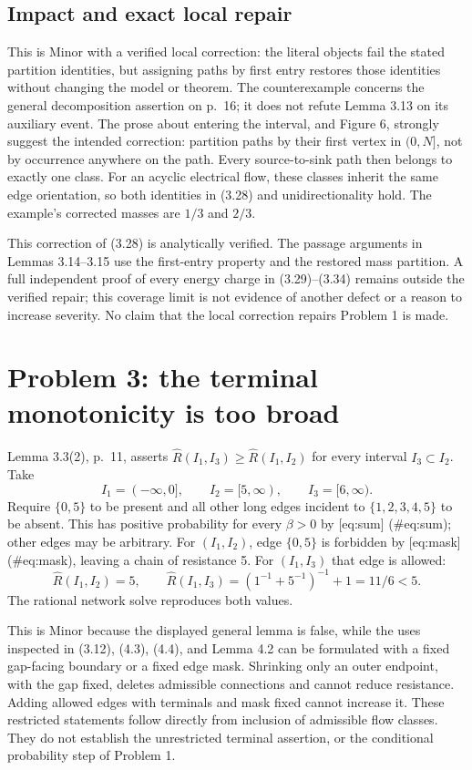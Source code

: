 \documentclass[10pt]{article}
\begin{document}
\subsection*{Impact and exact local repair}
This is Minor with a verified local correction: the literal objects fail the stated partition identities, but assigning paths by first entry restores those identities without changing the model or theorem. The counterexample concerns the general decomposition assertion on p. 16; it does not refute Lemma 3.13 on its auxiliary event. The prose about entering the interval, and Figure 6, strongly suggest the intended correction: partition paths by their first vertex in \((0,N]\), not by occurrence anywhere on the path. Every source-to-sink path then belongs to exactly one class. For an acyclic electrical flow, these classes inherit the same edge orientation, so both identities in (3.28) and unidirectionality hold. The example’s corrected masses are \(1/3\) and \(2/3\).\par
This correction of (3.28) is analytically verified. The passage arguments in Lemmas 3.14–3.15 use the first-entry property and the restored mass partition. A full independent proof of every energy charge in (3.29)–(3.34) remains outside the verified repair; this coverage limit is not evidence of another defect or a reason to increase severity. No claim that the local correction repairs Problem 1 is made.\par
\section*{Problem 3: the terminal monotonicity is too broad}
Lemma 3.3(2), p. 11, asserts \(\widehat R(I_1,I_3)\ge\widehat R(I_1,I_2)\) for every interval \(I_3\subset I_2\). Take \[I_1=(-\infty,0],\qquad I_2=[5,\infty),\qquad I_3=[6,\infty).\] Require \(\{0,5\}\) to be present and all other long edges incident to \(\{1,2,3,4,5\}\) to be absent. This has positive probability for every \(\beta>0\) by [eq:sum] (\#eq:sum); other edges may be arbitrary. For \((I_1,I_2)\), edge \(\{0,5\}\) is forbidden by [eq:mask] (\#eq:mask), leaving a chain of resistance 5. For \((I_1,I_3)\) that edge is allowed: \[\widehat R(I_1,I_2)=5,\qquad
       \widehat R(I_1,I_3)=(1^{-1}+5^{-1})^{-1}+1=11/6<5 .\] The rational network solve reproduces both values.\par
This is Minor because the displayed general lemma is false, while the uses inspected in (3.12), (4.3), (4.4), and Lemma 4.2 can be formulated with a fixed gap-facing boundary or a fixed edge mask. Shrinking only an outer endpoint, with the gap fixed, deletes admissible connections and cannot reduce resistance. Adding allowed edges with terminals and mask fixed cannot increase it. These restricted statements follow directly from inclusion of admissible flow classes. They do not establish the unrestricted terminal assertion, or the conditional probability step of Problem 1.\par
\end{document}
